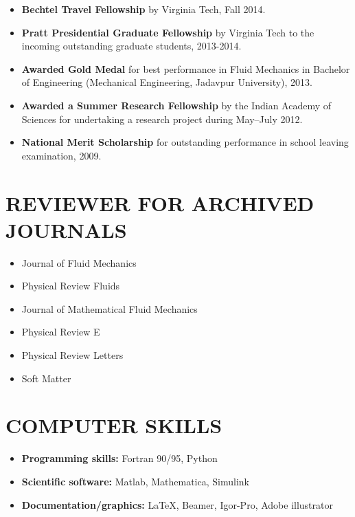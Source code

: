 \documentclass[10pt]{res} %
\begin{document}
\begin{resume}
\begin{itemize}
		\item \textbf{Bechtel Travel Fellowship} by Virginia Tech, Fall 2014.
		
		\item \textbf{Pratt Presidential Graduate Fellowship} by Virginia Tech to the incoming outstanding graduate students, 2013-2014.
		
		\item \textbf{Awarded Gold Medal} for best performance in Fluid Mechanics in Bachelor of Engineering (Mechanical Engineering, Jadavpur University), 2013.
		
		\item \textbf{Awarded a Summer Research Fellowship} by the Indian Academy of Sciences for undertaking a research project during May--July 2012.
		
     	\item \textbf{National Merit Scholarship} for outstanding performance in school leaving examination, 2009.
		\end{itemize}

\section{{REVIEWER FOR ARCHIVED JOURNALS}}
\vspace*{8mm}
\begin{itemize}
	\item Journal of Fluid Mechanics
	\item Physical Review Fluids
	\item Journal of Mathematical Fluid Mechanics
	\item Physical Review E
	\item Physical Review Letters
	\item Soft Matter
\end{itemize}
		

\section{{COMPUTER SKILLS}}

\vspace*{8mm}
\begin{itemize}
	\item \textbf{Programming skills:} Fortran 90/95, Python
	\item \textbf{Scientific software:} Matlab, Mathematica, Simulink
	\item \textbf{Documentation/graphics:} \LaTeX, Beamer, Igor-Pro, Adobe illustrator
\end{itemize}


\end{resume}
\end{document}
